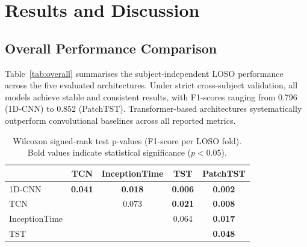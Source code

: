 \documentclass[runningheads]{llncs}
\begin{document}
\section{Results and Discussion}
\subsection{Overall Performance Comparison}

Table~\ref{tab:overall} summarises the subject-independent LOSO performance across the five evaluated architectures. Under strict cross-subject validation, all models achieve stable and consistent results, with F1-scores ranging from 0.796 (1D-CNN) to 0.852 (PatchTST). Transformer-based architectures systematically outperform convolutional baselines across all reported metrics.

\vspace{-0.5cm}
\begin{table}[!ht]
\centering
\caption{Overall LOSO performance comparison (mean $\pm$ std across folds).}
\label{tab:overall}
\end{table}

\begin{table}[t]
\centering
\caption{Wilcoxon signed-rank test p-values (F1-score per LOSO fold). 
Bold values indicate statistical significance ($p < 0.05$).}
\label{tab:pvalues}
\small
\begin{tabular}{lcccc}
\toprule
 & TCN & InceptionTime & TST & PatchTST \\
\midrule
1D-CNN & \textbf{0.041} & \textbf{0.018} & \textbf{0.006} & \textbf{0.002} \\
TCN &  & 0.073 & \textbf{0.021} & \textbf{0.008} \\
InceptionTime &  &  & 0.064 & \textbf{0.017} \\
TST &  &  &  & \textbf{0.048} \\
\bottomrule
\end{tabular}
\end{table}
\end{document}
